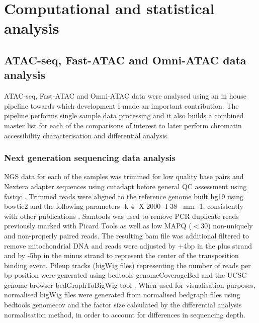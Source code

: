 \section{Computational and statistical analysis}

\subsection{ATAC-seq, Fast-ATAC and Omni-ATAC data analysis}
\label{ATAC_analysis}
ATAC-seq, Fast-ATAC and Omni-ATAC data were analysed using an in house pipeline towards which development I made an important contribution. The pipeline performs single sample data processing and it also builds a combined master list for each of the comparisons of interest to later perform chromatin accessibility characterisation and differential analysis. 

\subsubsection{Next generation sequencing data analysis}
NGS data for each of the samples was trimmed for low quality base pairs and Nextera adapter sequences using cutadapt \parencite{} before general QC assessment using fastqc \parencite{Andrews2010}. Trimmed reads were aligned to the reference genome built hg19 using bowtie2 \parencite{Langmead2006} and the following parameters -k 4 -X 2000 -I 38 --mm -1, consistently with other publications \parencite{Buenrostro2013, Corces2016}. Samtools \parencite{} was used to remove PCR duplicate reads previously marked with Picard Tools \parencite{} as well as low MAPQ (${<}$30) non-uniquely and non-properly paired reads. The resulting bam file was additional filtered to remove mitochondrial DNA and reads were adjusted by +4bp in the plus strand and by -5bp in the minus strand to represent the center of the transposition binding event. Pileup tracks (bigWig files) representing the number of reads per bp position  were generated using bedtools genomeCoverageBed \parencite{} and the UCSC genome browser bedGraphToBigWig tool \parencite{}. When used for visualisation purposes, normalised bigWig files were generated from normalised bedgraph files using bedtools genomecov and the factor size calculated by the differential analysis normalisation method, in order to account for differences in sequencing depth. 

